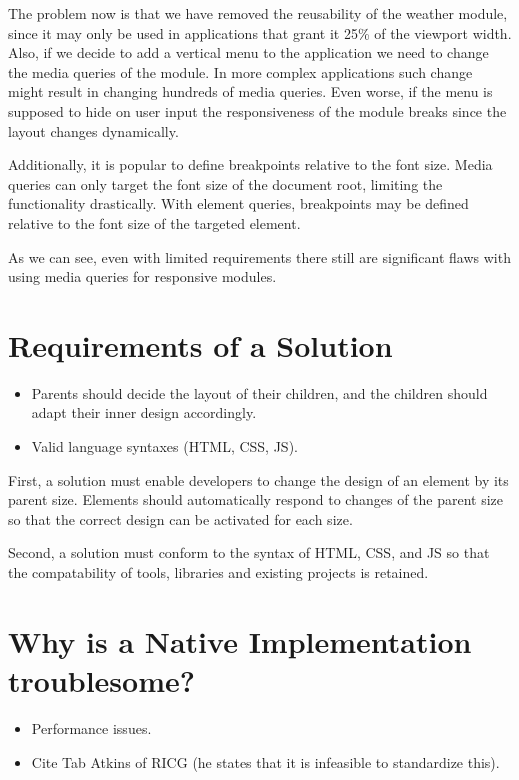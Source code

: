 \documentclass{acm_proc_article-sp}
\begin{document}
  The problem now is that we have removed the reusability of the weather module, since it may only be used in applications that grant it 25\% of the viewport width.
  Also, if we decide to add a vertical menu to the application we need to change the media queries of the module.
  In more complex applications such change might result in changing hundreds of media queries.
  Even worse, if the menu is supposed to hide on user input the responsiveness of the module breaks since the layout changes dynamically.

  Additionally, it is popular to define breakpoints relative to the font size.
  Media queries can only target the font size of the document root, limiting the functionality drastically.
  With element queries, breakpoints may be defined relative to the font size of the targeted element.

  As we can see, even with limited requirements there still are significant flaws with using media queries for responsive modules.

\section{Requirements of a Solution}
  \begin{itemize}
    \item Parents should decide the layout of their children, and the children should adapt their inner design accordingly.
    \item Valid language syntaxes (HTML, CSS, JS).
  \end{itemize}

  First, a solution must enable developers to change the design of an element by its parent size.
  Elements should automatically respond to changes of the parent size so that the correct design can be activated for each size.

  Second, a solution must conform to the syntax of HTML, CSS, and JS so that the compatability of tools, libraries and existing projects is retained.

\section{Why is a Native Implementation troublesome?}
  \begin{itemize}
    \item Performance issues.
    \item Cite Tab Atkins of RICG (he states that it is infeasible to standardize this).
  \end{itemize}
\end{document}
